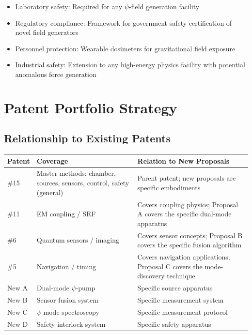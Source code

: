 \documentclass[11pt,a4paper]{article}
\begin{document}
\begin{itemize}[nosep]
\item Laboratory safety: Required for any $\psi$-field
generation facility
\item Regulatory compliance: Framework for government
safety certification of novel field generators
\item Personnel protection: Wearable dosimeters for
gravitational field exposure
\item Industrial safety: Extension to any high-energy
physics facility with potential anomalous force generation
\end{itemize}

\section{Patent Portfolio Strategy}

\subsection{Relationship to Existing Patents}

\begin{longtable}{p{}p{}p{}}
\toprule
\textbf{Patent} & \textbf{Coverage} & \textbf{Relation to New Proposals} \\
\midrule
\endhead
\#15 & Master methods: chamber, sources, sensors, control, safety
(general) & Parent patent; new proposals are specific embodiments \\
\#11 & EM coupling / SRF & Covers coupling physics; Proposal A covers
the specific dual-mode apparatus \\
\#6 & Quantum sensors / imaging & Covers sensor concepts; Proposal B
covers the specific fusion algorithm \\
\#5 & Navigation / timing & Covers navigation applications; Proposal C
covers the mode-discovery technique \\
New A & Dual-mode $\psi$-pump & Specific source apparatus \\
New B & Sensor fusion system & Specific measurement system \\
New C & $\psi$-mode spectroscopy & Specific measurement protocol \\
New D & Safety interlock system & Specific safety apparatus \\
\bottomrule
\end{longtable}
\end{document}
